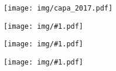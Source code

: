\documentclass[12pt,twoside]{report}
\newcommand{\figuragrande}[1] {
    \begin{figure}[!htbp]
      \begin{center}
        \texttt{[image: img/\#1.pdf]}
      \end{center}
    \end{figure}
}
\newcommand{\quadrinhos}[1] {
    \figuragrande{quad#1}
}
\begin{document}
\begin{figure}[p]
    \hspace{1.7cm}
    \texttt{[image: img/capa\_2017.pdf]} %
\end{figure}
\thispagestyle{empty} %
\clearpage
\newpage











\renewcommand{\contentsname}{\center Esse guia contém...}

\tableofcontents
\thispagestyle{empty}
\newpage




\quadrinhos{1}


\quadrinhos{2}




\quadrinhos{6}


\end{document}
